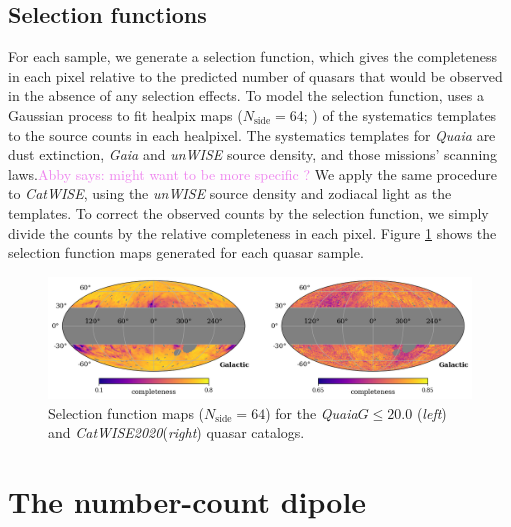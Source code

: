 \documentclass[modern]{aastex631}
\newcommand{\abby}[1]{\textcolor{violet}{Abby says: #1}}
\newcommand{\catwise}{\textsl{CatWISE}\xspace}
\newcommand{\catwisetwentytwenty}{\textsl{CatWISE2020}\xspace}
\newcommand{\quaia}{\textsl{Quaia}\xspace}
\newcommand{\gaia}{\textsl{Gaia}\xspace}
\newcommand{\unwise}{\textsl{unWISE}\xspace}
\newcommand{\nside}{N_\mathrm{side}}
\begin{document}
\subsection{Selection functions}
\label{sec:selfuncs}
For each sample, we generate a selection function, which gives the completeness in each pixel relative to the predicted number of quasars that would be observed in the absence of any selection effects.
To model the selection function, \cite{storey-fisher_quaia_2023} uses a Gaussian process to fit healpix maps ($\nside=64$; \citealt{gorski_healpix_2005}) of the systematics templates to the source counts in each healpixel.
The systematics templates for \quaia are dust extinction, \gaia and \unwise source density, and those missions' scanning laws.\abby{might want to be more specific ?}
We apply the same procedure to \catwise, using the \unwise source density and zodiacal light as the templates.
To correct the observed counts by the selection function, we simply divide the counts by the relative completeness in each pixel.
Figure \ref{fig:selfuncs} shows the selection function maps generated for each quasar sample.

\begin{figure}
    \centering
    \includegraphics[width=\textwidth]{images/selfuncs.png}
    \caption{Selection function maps ($\nside=64$) for the \quaia $G\le20.0$ (\textit{left}) and \catwisetwentytwenty (\textit{right}) quasar catalogs.}
    \label{fig:selfuncs}
\end{figure}


\section{The number-count dipole}
\label{sec:dipole_theory}
\end{document}
